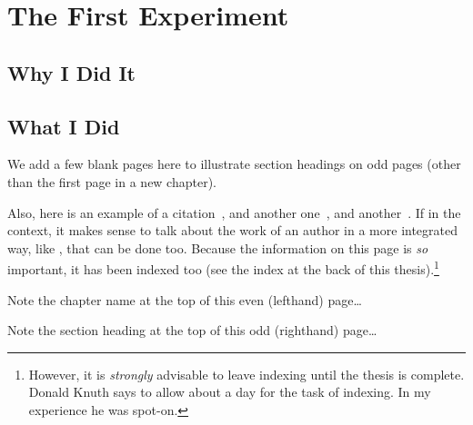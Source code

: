 
\chapter{The First Experiment}
\label{cha:firstexp}

\section{Why I Did It}
\label{sec:why1}

\section{What I Did}
\label{sec:what1}

We add a few blank pages here to illustrate section
headings on odd
pages (other than the first page in a new chapter).

Also, here is an example of a citation~\cite{lamport94}, and another
one~\cite{knuth86}, and another~\cite{goossens94}.  If in the context,
it makes sense to talk about the work of an author in a more
integrated way, like , that can be done
too.  Because the information on this page
is \emph{so} important, it has been indexed too (see the index at the
back of this thesis).\footnote{However, it is \emph{strongly}
  advisable to leave indexing until the thesis is complete.  Donald
  Knuth says to allow about a day for the task of indexing.  In my
  experience he was spot-on.}

\clearpage Note the chapter name at the top of this even (lefthand)
page\dots

\cleardoublepage
Note the section heading at the top of this odd (righthand) page\dots

